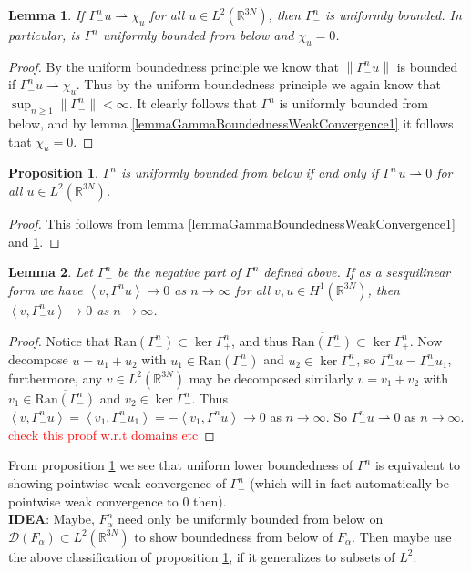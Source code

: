 \documentclass[a4paper,11pt]{article}
\newcommand{\norm}[1]{\left\lVert #1 \right\rVert}
\newcommand{\dom}[1]{\mathscr D\left(#1\right)}
\newcommand{\Ran}[1]{\text{Ran}\left(#1\right)}
\renewcommand{\braket}[1]{\left\langle#1\right\rangle}
\newcommand{\R}{\mathbb{R}}
\newtheorem{proposition}{Proposition}
\newtheorem{lemma}{Lemma}
\numberwithin{equation}{section}
\begin{document}
	\begin{lemma}\label{lemmaGammaBoundednessWeakConvergence2}
		If $ \Gamma^n_- u\rightharpoonup\chi_u $ for all $ u\in L^2(\R^{3N}) $, then $ \Gamma^n_- $ is uniformly bounded. In particular, is $ \Gamma^n $ uniformly bounded from below and $ \chi_u=0 $.
	\end{lemma}
	\begin{proof}
		By the uniform boundedness principle we know that $ \norm{\Gamma^n_- u }$ is bounded if $ \Gamma^n_- u\rightharpoonup\chi_u $. Thus by the uniform boundedness principle we again know that $ \sup_{n\geq1}\norm{\Gamma^n_-}<\infty $. It clearly follows that $ \Gamma^n $ is uniformly bounded from below, and by lemma \ref{lemmaGammaBoundednessWeakConvergence1} it follows that $ \chi_u=0 $.
	\end{proof}
	\begin{proposition}\label{propositionUniformLowerBoundiffWeakConvergence}
		$ \Gamma^n $ is uniformly bounded from below if and only if $ \Gamma^n_-u\rightharpoonup0 $ for all $ u\in L^2(\R^{3N}) $.
	\end{proposition}
	\begin{proof}
		This follows from lemma \ref{lemmaGammaBoundednessWeakConvergence1} and \ref{lemmaGammaBoundednessWeakConvergence2}.
	\end{proof}
	\begin{lemma}\label{lemmaGammaNegativePartPointwiseUniformBounded}
		Let $ \Gamma^n_- $ be the negative part of $ \Gamma^n $ defined above. If as a sesquilinear form we have $ \braket{v,\Gamma^n u}\to0 $ as $ n\to\infty $ for all  $v,u\in H^1(\R^{3N})$, then  $ \braket{v,\Gamma^n_- u}\to0 $ as $ n\to\infty $.
	\end{lemma}
	\begin{proof}
	 Notice that $ \Ran{\Gamma_-^n}\subset\ker\Gamma^n_+ $, and thus $ \overline{\Ran{\Gamma_-^n}}\subset\ker\Gamma^n_+ $. Now decompose $ u=u_1+u_2 $ with $ u_1\in\overline{\Ran{\Gamma^n_-}} $ and $ u_2\in\ker\Gamma^n_- $, so $ \Gamma^n_-u=\Gamma_-^n u_1 $, furthermore, any $ v\in L^2(\R^{3N}) $ may be decomposed similarly $ v=v_1+v_2 $ with $ v_1\in\overline{\Ran{\Gamma^n_-}} $ and $ v_2\in\ker\Gamma^n_- $. Thus $ \braket{v,\Gamma^n_-u}=\braket{v_1,\Gamma^n_-u_1}=-\braket{v_1,\Gamma^n u}\to0 $ as $ n\to\infty $. So $ \Gamma^n_-u\rightharpoonup 0 $ as $ n\to\infty $. \textcolor{red}{check this proof w.r.t domains etc}
	\end{proof}
	From proposition \ref{propositionUniformLowerBoundiffWeakConvergence} we see that uniform lower boundedness of $ \Gamma^n $ is equivalent to showing pointwise weak convergence of $ \Gamma^n_- $ (which will in fact automatically be pointwise weak convergence to $ 0 $ then). \\
	\textbf{IDEA}: Maybe, $ F_\alpha^n $ need only be uniformly bounded from below on $   \dom{F_\alpha}\subset L^2(\R^{3N}) $ to show boundedness from below of $ F_\alpha $. Then maybe use the above classification of proposition \ref{propositionUniformLowerBoundiffWeakConvergence}, if it generalizes to subsets of $ L^2 $.
\end{document}
